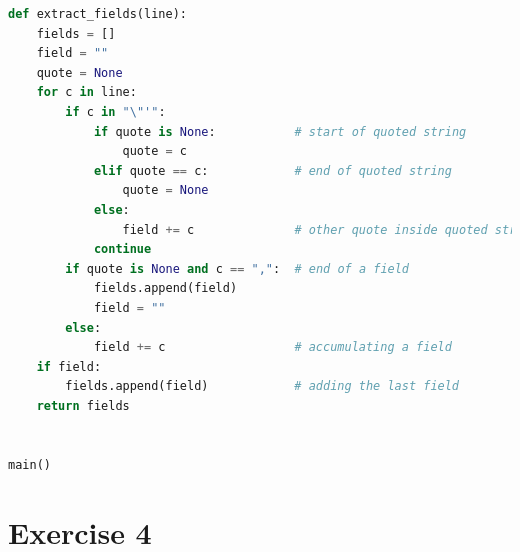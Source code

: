 \documentclass{report}
\begin{document}
\begin{lstlisting}[language=Python, style=pythonStyle]
def extract_fields(line):
    fields = []
    field = ""
    quote = None
    for c in line:
        if c in "\"'":
            if quote is None:           # start of quoted string
                quote = c
            elif quote == c:            # end of quoted string
                quote = None
            else:
                field += c              # other quote inside quoted string
            continue
        if quote is None and c == ",":  # end of a field
            fields.append(field)
            field = ""
        else:
            field += c                  # accumulating a field
    if field:
        fields.append(field)            # adding the last field
    return fields


main()

\end{lstlisting}

\section*{Exercise 4}
\begin{lstlisting}[language=Python, style=pythonStyle]

\end{lstlisting}
\end{document}
